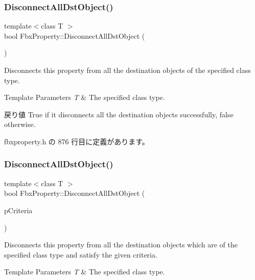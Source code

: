 \subsubsection{\texorpdfstring{Disconnect\+All\+Dst\+Object()}{DisconnectAllDstObject()}\hspace{0.1cm}{\footnotesize\ttfamily [3/4]}}
{\footnotesize\ttfamily template$<$class T $>$ \\
bool Fbx\+Property\+::\+Disconnect\+All\+Dst\+Object (\begin{DoxyParamCaption}{ }\end{DoxyParamCaption})\hspace{0.3cm}{\ttfamily [inline]}}

Disconnects this property from all the destination objects of the specified class type. 
\begin{DoxyTemplParams}{Template Parameters}
{\em T} & The specified class type. \\
\hline
\end{DoxyTemplParams}
\begin{DoxyReturn}{戻り値}
{\ttfamily True} if it disconnects all the destination objects successfully, {\ttfamily false} otherwise. 
\end{DoxyReturn}


 fbxproperty.\+h の 876 行目に定義があります。

\mbox{\label{class_fbx_property_aa87d6cc464919a95dd7fd428b28c6e48}} 
\subsubsection{\texorpdfstring{Disconnect\+All\+Dst\+Object()}{DisconnectAllDstObject()}\hspace{0.1cm}{\footnotesize\ttfamily [4/4]}}
{\footnotesize\ttfamily template$<$class T $>$ \\
bool Fbx\+Property\+::\+Disconnect\+All\+Dst\+Object (\begin{DoxyParamCaption}\item[{const \hyperlink{class_fbx_criteria}{Fbx\+Criteria} \&}]{p\+Criteria }\end{DoxyParamCaption})\hspace{0.3cm}{\ttfamily [inline]}}

Disconnects this property from all the destination objects which are of the specified class type and satisfy the given criteria. 
\begin{DoxyTemplParams}{Template Parameters}
{\em T} & The specified class type. \\
\hline
\end{DoxyTemplParams}

